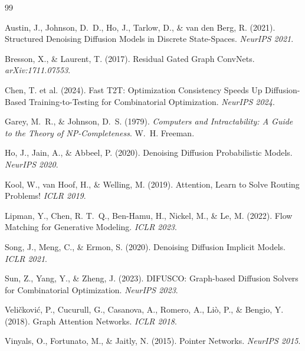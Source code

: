 \documentclass[11pt,a4paper]{article}
\begin{document}

\begin{thebibliography}{99}

Austin, J., Johnson, D.~D., Ho, J., Tarlow, D., \& van den Berg, R. (2021).
Structured Denoising Diffusion Models in Discrete State-Spaces.
\textit{NeurIPS 2021}.

Bresson, X., \& Laurent, T. (2017).
Residual Gated Graph ConvNets.
\textit{arXiv:1711.07553}.

Chen, T. et al. (2024).
Fast T2T: Optimization Consistency Speeds Up Diffusion-Based Training-to-Testing
for Combinatorial Optimization.
\textit{NeurIPS 2024}.

Garey, M.~R., \& Johnson, D.~S. (1979).
\textit{Computers and Intractability: A Guide to the Theory of NP-Completeness}.
W.~H. Freeman.

Ho, J., Jain, A., \& Abbeel, P. (2020).
Denoising Diffusion Probabilistic Models.
\textit{NeurIPS 2020}.

Kool, W., van Hoof, H., \& Welling, M. (2019).
Attention, Learn to Solve Routing Problems!
\textit{ICLR 2019}.

Lipman, Y., Chen, R. T.~Q., Ben-Hamu, H., Nickel, M., \& Le, M. (2022).
Flow Matching for Generative Modeling.
\textit{ICLR 2023}.

Song, J., Meng, C., \& Ermon, S. (2020).
Denoising Diffusion Implicit Models.
\textit{ICLR 2021}.

Sun, Z., Yang, Y., \& Zheng, J. (2023).
DIFUSCO: Graph-based Diffusion Solvers for Combinatorial Optimization.
\textit{NeurIPS 2023}.

Veli\v{c}kovi\'{c}, P., Cucurull, G., Casanova, A., Romero, A., Li\`{o}, P.,
\& Bengio, Y. (2018).
Graph Attention Networks. \textit{ICLR 2018}.

Vinyals, O., Fortunato, M., \& Jaitly, N. (2015).
Pointer Networks. \textit{NeurIPS 2015}.

\end{thebibliography}
\end{document}
